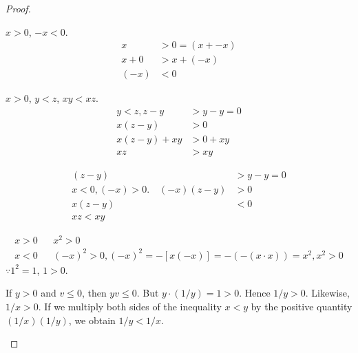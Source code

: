 \begin{proof}
    \begin{asparaenum}[(a)]
    \item $x>0$, $-x<0$. 
    \begin{align*}
        x   &> 0=(x+-x)\\
        x+0 &> x+(-x)\\
        (-x)&<0
    \end{align*}

    \item $x>0$, $y<z$, $xy<xz$.
    \begin{align*}
        y<z, z-y&>y-y=0\\
        x(z-y)&>0\\
        x(z-y)+xy&>0+xy\\
        xz&>xy
    \end{align*}

    \item
    \begin{align*}
        (z-y) &>y-y=0\\
        x<0,(-x)>0.\quad (-x)(z-y)&>0 \\
        x(z-y) &<0\\
        xz<xy    
    \end{align*}

    \item
    \begin{align*}
        x>0  && x^2    >0  \\
        x<0  &&(-x)^2 >0, (-x)^2 = -[x(-x)] = -(-(x\cdot x)) =x^2, x^2>0
    \end{align*}
    $\because 1^2=1$, $1>0$.

    \item
    If $y>0$ and $v \leq 0$, then $yv \leq 0$. 
    But $y \cdot (1/y)=1>0$. Hence $1/y > 0$.
    Likewise, $1/x > 0$. 
    If we multiply both sides of the inequality $x <y$ by
    the positive quantity $(1/x)(1/y)$, we obtain $1/y <1/x$.
    \end{asparaenum}
\end{proof}

